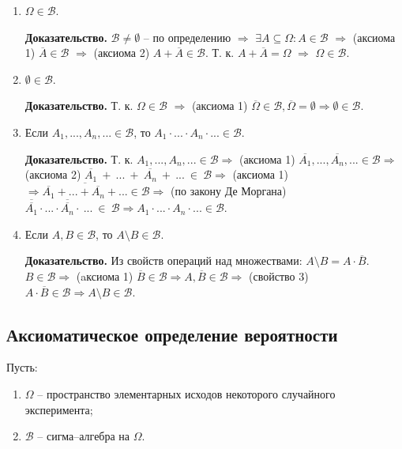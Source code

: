 \begin{enumerate}
	\item $\Omega \in \mathcal{B}$.
	
	\textbf{Доказательство.} $\mathcal{B} \neq \emptyset$ -- по определению $\Rightarrow$ $\exists A \subseteq \Omega: A \in \mathcal{B}$ $\Rightarrow$ (аксиома 1) $\overline{A} \in \mathcal{B}$ $\Rightarrow$ (аксиома 2) $A + \overline{A} \in \mathcal{B}$. Т. к. $A + \overline{A} = \Omega$ $\Rightarrow$ $\Omega \in \mathcal{B}$.
	
	\item $\emptyset \in \mathcal{B}$.
	
	\textbf{Доказательство.} Т. к. $\Omega \in \mathcal{B}$ $\Rightarrow$ (аксиома 1) $\overline{\Omega} \in \mathcal{B}, \overline{\Omega} = \emptyset \Rightarrow \emptyset \in \mathcal{B}$.
	
	\item Если $A_1, ..., A_n, ... \in \mathcal{B}$, то $A_1 \cdot ... \cdot A_n \cdot ... \in \mathcal{B}$.
	
	\textbf{Доказательство.} Т. к.  $A_1, ..., A_n, ... \in \mathcal{B} \Rightarrow$ (аксиома 1) $\overline{A_1}, ...,\overline{A_n}, ... \in \mathcal{B} \Rightarrow$ (аксиома 2) $\overline{A_1}~+~...~+~\overline{A_n}~+~...~\in~\mathcal{B} \Rightarrow$ (аксиома 1) $\Rightarrow \overline{\overline{A_1} + ... +\overline{A_n} + ...} \in \mathcal{B} \Rightarrow$ (по закону Де Моргана) $\overline{\overline{A_1}} \cdot ... \cdot \overline{\overline{A_n}} \cdot~...~\in~\mathcal{B} \Rightarrow A_1 \cdot ... \cdot A_n \cdot ... \in \mathcal{B}$.
	
	\item Если $A, B \in \mathcal{B}$, то $A \setminus B \in \mathcal{B}$.
	
	\textbf{Доказательство.} Из свойств операций над множествами: $A \setminus B = A \cdot \overline{B}$. $B \in \mathcal{B} \Rightarrow$ (aксиома 1) $\overline{B} \in \mathcal{B} \Rightarrow A, \overline{B} \in \mathcal{B} \Rightarrow$ (свойство 3) $A \cdot \overline{B} \in \mathcal{B} \Rightarrow A \setminus B \in \mathcal{B}$.
\end{enumerate}

\subsection*{Аксиоматическое определение вероятности}

Пусть:
\begin{enumerate}[label=\arabic*)]
	\item $\Omega$ -- пространство элементарных исходов некоторого случайного эксперимента;
	\item $\mathcal{B}$ -- сигма--алгебра на $\Omega$.
\end{enumerate}

